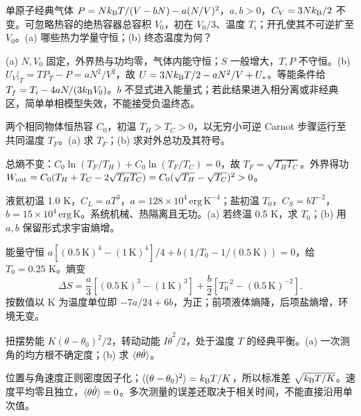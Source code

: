 \begin{exercise}
单原子经典气体 $P=Nk_{\mathrm B} T/(V-bN)-a(N/V)^2$，$a,b>0$，$C_V=3Nk_{\mathrm B}/2$ 不变。可忽略热容的绝热容器总容积 $V_0$，初在 $V_0/3$、温度 $T_i$；开孔使其不可逆扩至 $V_0$。(a) 哪些热力学量守恒；(b) 终态温度为何？
\end{exercise}
\begin{solution}
(a) $N,V_0$ 固定，外界热与功均零，气体内能守恒；$S$ 一般增大，$T,P$ 不守恒。(b) $U_V|_T=TP_T-P=aN^2/V^2$，故 $U=3Nk_{\mathrm B} T/2-aN^2/V+U_*$。等能条件给 $T_f=T_i-4aN/(3k_{\mathrm B} V_0)$。$b$ 不显式进入能量式；若此结果进入相分离或非经典区，简单单相模型失效，不能接受负温终态。
\end{solution}
\begin{exercise}
两个相同物体恒热容 $C_0$，初温 $T_H>T_C>0$，以无穷小可逆 Carnot 步骤运行至共同温度 $T_F$。(a) 求 $T_F$；(b) 求对外总功及其符号。
\end{exercise}
\begin{solution}
总熵不变：$C_0\ln(T_F/T_H)+C_0\ln(T_F/T_C)=0$，故 $T_F=\sqrt{T_HT_C}$。外界得功 $W_{\rm out}=C_0(T_H+T_C-2\sqrt{T_HT_C})=C_0(\sqrt{T_H}-\sqrt{T_C})^2>0$。
\end{solution}
\begin{exercise}
液氦初温 1.0 K，$C_L=aT^3$，$a=128\times10^4\,\mathrm{erg\,K^{-4}}$；盐初温 $T_0$，$C_S=bT^{-2}$，$b=15\times10^4\,\mathrm{erg\,K}$。系统机械、热隔离且无功。(a) 若终温 0.5 K，求 $T_0$；(b) 用 $a,b$ 保留形式求宇宙熵增。
\end{exercise}
\begin{solution}
能量守恒 $a[(0.5\,\mathrm K)^4-(1\,\mathrm K)^4]/4+b(1/T_0-1/(0.5\,\mathrm K))=0$，给 $T_0=0.25$ K。熵变
\[\Delta S=\frac a3[(0.5\,\mathrm K)^3-(1\,\mathrm K)^3]+\frac b2[T_0^{-2}-(0.5\,\mathrm K)^{-2}].\]
按数值以 K 为温度单位即 $-7a/24+6b$，为正；前项液体熵降，后项盐熵增，环境无变。
\end{solution}
\begin{exercise}
扭摆势能 $K(\theta-\theta_0)^2/2$，转动动能 $I\dot\theta^2/2$，处于温度 $T$ 的经典平衡。(a) 一次测角的均方根不确定度；(b) 求 $\langle \theta\dot\theta\rangle$。
\end{exercise}
\begin{solution}
位置与角速度正则密度因子化；$\langle (\theta-\theta_0)^2\rangle=k_{\mathrm B} T/K$，所以标准差 $\sqrt{k_{\mathrm B} T/K}$。速度平均零且独立，$\langle \theta\dot\theta\rangle=0$。多次测量的误差还取决于相关时间，不能直接沿用单次值。
\end{solution}

